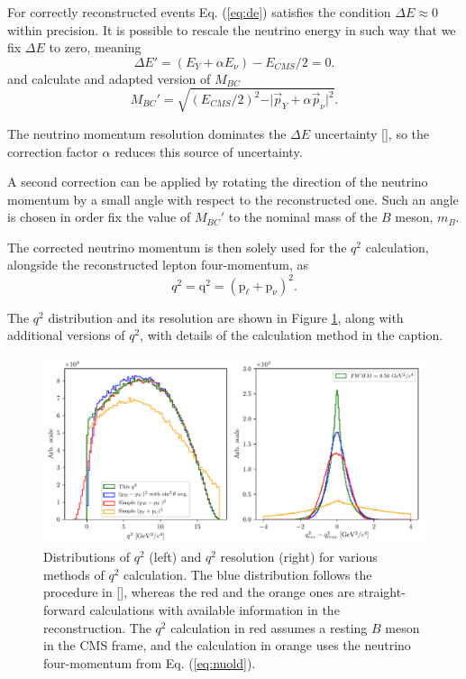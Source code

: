 \documentclass[  headings=standardclasses,
  headings=big,oneside,a4paper,openany,12pt]{scrbook}
\begin{document}
For correctly reconstructed events Eq. (\ref{eq:de}) satisfies the condition $\Delta E \approx 0$ within precision. It is possible to rescale the neutrino energy in such way that we fix $\Delta E$ to zero, meaning 
\begin{equation}
\Delta E' = (E_Y + \alpha E_\nu) - E_{CMS}/2 = 0.
\end{equation}
and calculate and adapted version of $M_{BC}$
\begin{equation}
M_{BC}' = \sqrt{\left(E_{CMS}/2\right)^2 - \vert \vec{p}_Y + \alpha \vec{p}_\nu \vert^2}.
\end{equation}

The neutrino momentum resolution dominates the $\Delta E$ uncertainty [], so the correction factor $\alpha$ reduces this source of uncertainty.

A second correction can be applied by rotating the direction of the neutrino momentum by a small angle with respect to the reconstructed one. Such an angle is chosen in order fix the value of $M_{BC}'$ to the nominal mass of the $B$ meson, $m_B$.

The corrected neutrino momentum is then solely used for the $q^2$ calculation, alongside the reconstructed lepton four-momentum, as
\begin{equation}
\label{eq:q2}
q^2 = \mathrm{q}^2 = \left(\mathrm{p}_\ell + \mathrm{p}_\nu \right)^2.
\end{equation}

The $q^2$ distribution and its resolution are shown in Figure \ref{fig:q2}, along with additional versions of $q^2$, with details of the calculation method in the caption.
\begin{figure}[H]
\centering
\captionsetup{width=0.8\linewidth}
\includegraphics[width=\linewidth]{fig/q2}
\caption{Distributions of $q^2$ (left) and $q^2$ resolution (right) for various methods of $q^2$ calculation. The blue distribution follows the procedure in [], whereas the red and the orange ones are straight-forward calculations with available information in the reconstruction. The $q^2$ calculation in red assumes a resting $B$ meson in the CMS frame, and the calculation in orange uses the neutrino four-momentum from Eq. (\ref{eq:nuold}).}
\label{fig:q2}
\end{figure}
\end{document}
